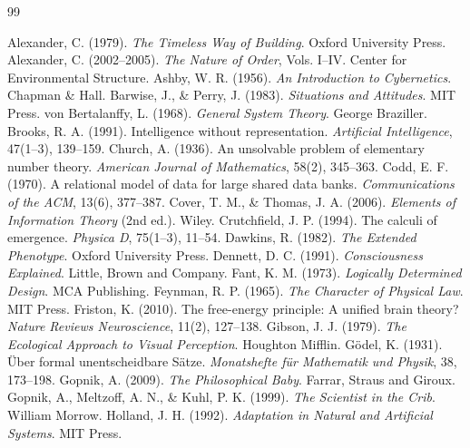 \documentclass[11pt, oneside]{book}
\theoremstyle{definition}
\theoremstyle{remark}
\begin{document}
\begin{thebibliography}{99}

 Alexander, C. (1979). \textit{The Timeless Way of Building}. Oxford University Press.
 Alexander, C. (2002--2005). \textit{The Nature of Order}, Vols. I--IV. Center for Environmental Structure.
 Ashby, W. R. (1956). \textit{An Introduction to Cybernetics}. Chapman \& Hall.
 Barwise, J., \& Perry, J. (1983). \textit{Situations and Attitudes}. MIT Press.
 von Bertalanffy, L. (1968). \textit{General System Theory}. George Braziller.
 Brooks, R. A. (1991). Intelligence without representation. \textit{Artificial Intelligence}, 47(1--3), 139--159.
 Church, A. (1936). An unsolvable problem of elementary number theory. \textit{American Journal of Mathematics}, 58(2), 345--363.
 Codd, E. F. (1970). A relational model of data for large shared data banks. \textit{Communications of the ACM}, 13(6), 377--387.
 Cover, T. M., \& Thomas, J. A. (2006). \textit{Elements of Information Theory} (2nd ed.). Wiley.
 Crutchfield, J. P. (1994). The calculi of emergence. \textit{Physica D}, 75(1--3), 11--54.
 Dawkins, R. (1982). \textit{The Extended Phenotype}. Oxford University Press.
 Dennett, D. C. (1991). \textit{Consciousness Explained}. Little, Brown and Company.
 Fant, K. M. (1973). \textit{Logically Determined Design}. MCA Publishing.
 Feynman, R. P. (1965). \textit{The Character of Physical Law}. MIT Press.
 Friston, K. (2010). The free-energy principle: A unified brain theory? \textit{Nature Reviews Neuroscience}, 11(2), 127--138.
 Gibson, J. J. (1979). \textit{The Ecological Approach to Visual Perception}. Houghton Mifflin.
 G\"odel, K. (1931). \"Uber formal unentscheidbare S\"atze. \textit{Monatshefte f\"ur Mathematik und Physik}, 38, 173--198.
 Gopnik, A. (2009). \textit{The Philosophical Baby}. Farrar, Straus and Giroux.
 Gopnik, A., Meltzoff, A. N., \& Kuhl, P. K. (1999). \textit{The Scientist in the Crib}. William Morrow.
 Holland, J. H. (1992). \textit{Adaptation in Natural and Artificial Systems}. MIT Press.

\end{thebibliography}
\end{document}
